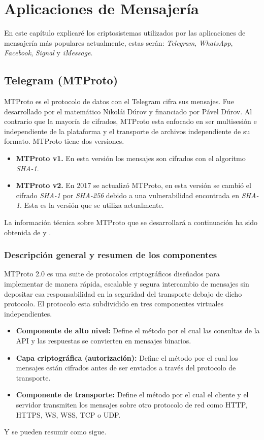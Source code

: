 \chapter{Aplicaciones de Mensajería}

En este capítulo explicaré los criptosistemas utilizados por las aplicaciones de mensajería más populares actualmente, estas serán: \emph{Telegram}, \emph{WhatsApp}, \emph{Facebook}, \emph{Signal} y \emph{iMessage}.

\section{Telegram (MTProto)}
MTProto es el protocolo de datos con el Telegram cifra sus mensajes. Fue desarrollado por el matemático Nikolái Dúrov y financiado por Pável Dúrov. Al contrario que la mayoría de cifrados, MTProto esta enfocado en ser multisesión e independiente de la plataforma y el transporte de archivos independiente de su formato. MTProto tiene dos versiones.
\begin{itemize}
	\item \textbf{MTProto v1.} En esta versión los mensajes son cifrados con el algoritmo \emph{SHA-1}.
	\item \textbf{MTProto v2.} En 2017 se actualizó MTProto, en esta versión se cambió el cifrado \emph{SHA-1} por \emph{SHA-256} debido a una vulnerabilidad encontrada en \emph{SHA-1}. Esta es la versión que se utiliza actualmente. 
\end{itemize}
La información técnica sobre MTProto que se desarrollará a continuación ha sido obtenida de \cite{Miculan2021} y \cite{WebProto}.

\subsection{Descripción general y resumen de los componentes}
MTProto 2.0 es una suite de protocolos criptográficos diseñados para implementar de manera rápida, escalable y segura intercambio de mensajes sin depositar esa responsabilidad en la seguridad del transporte debajo de dicho protocolo.
El protocolo esta subdividido en tres componentes virtuales independientes.
\begin{itemize}
	\item \textbf{Componente de alto nivel:} Define el método por el cual las consultas de la API y las respuestas se convierten en mensajes binarios. 
	\item \textbf{Capa criptográfica (autorización):} Define el método por el cual los mensajes están cifrados antes de ser enviados a través del protocolo de transporte.
	\item \textbf{Componente de transporte:} Define el método por el cual el cliente y el servidor transmiten los mensajes sobre otro protocolo de red como HTTP, HTTPS, WS, WSS, TCP o UDP.
\end{itemize}
Y se pueden resumir como sigue.\\

